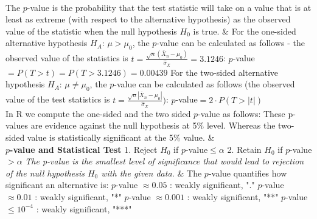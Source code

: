 {		
	\begin{twoColTable} 
		\hline
		\\
		\hline
		The $p$-value is the probability that the test statistic will take on a value that is at least as extreme (with respect to the alternative hypothesis) as the observed value of the statistic when the null hypothesis $H_0$ is true.
		& For the one-sided alternative hypothesis $H_A$: $\mu > \mu_0$, the $p$-value can be calculated as follows - the observed value of the statistics is $t=\frac{\sqrt{n}(\bar{X}_n - \mu_0)}{\hat{\sigma}_{X}}=3.1246$:\vfill 
		\vspace*{0.2cm}
		$p$-value$ = P(T>t)=P(T>3.1246)=0.00439$
		\vspace*{0.2cm}
		For the two-sided alternative hypothesis $H_A$: $\mu \neq \mu_0$, the $p$-value can be calculated
		as follows (the observed value of the test statistics is $t=\frac{\sqrt{n}|\bar{X}_n - \mu_0|}{\hat{\sigma}_{X}})$:\vfill
		\vspace*{0.2cm}
		$p$-value$ = 2 \cdot P(T>|t|)$
		\\
		In {\color{blue}R} we compute the one-sided and the two sided $p$-value as follows:\vfill
		\vspace*{0.5cm}
		These p-values are evidence against the null hypothesis at 5$\%$ level. Whereas the two-sided value is statistically significant at the 5$\%$ value.
		& {}\\
		\hline
		\textbf{$p$-value and Statistical Test}\vfill
		1. Reject $H_0$ if $p$-value$ \leq \alpha$ \vfill
		2. Retain $H_0$ if $p$-value$ > \alpha$ \vfill
		\textit{The p-value is the smallest level of significance that would lead to rejection of the null hypothesis $H_0$ with the given data.}
		& The $p$-value quantifies how significant an alternative is: \vfill
		$p$-value $\approx 0.05$ : weakly significant, "."\vfill
		$p$-value $\approx 0.01$ : weakly significant, "*"\vfill
		$p$-value $\approx 0.001$ : weakly significant, "**"\vfill
		$p$-value $\leq 10^{-4}$ : weakly significant, "***"\\
		\hline
	\end{twoColTable}
	}